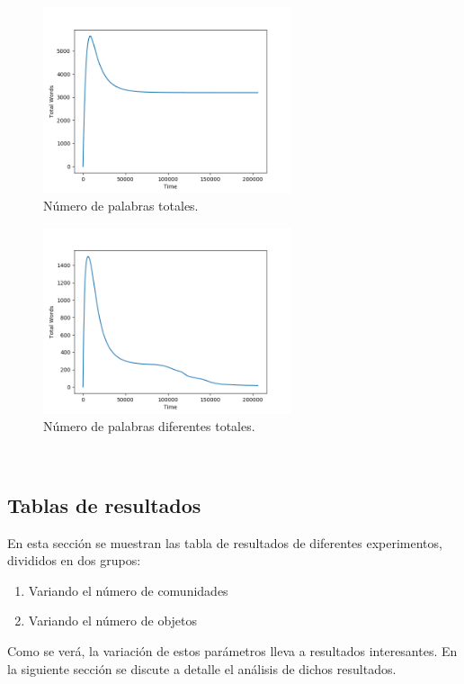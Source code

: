 \documentclass[runningheads]{llncs}
\begin{document}
\begin{figure}[H]
	\centering
	\includegraphics[width=0.65\textwidth]{Figure_333_TotalWords.png}
	\caption{Número de palabras totales.}
	\label{fig_006}
\end{figure}
\begin{figure}[H]
	\centering
	\includegraphics[width=0.65\textwidth]{Figure_333_TotalDifferentWords.png}
	\caption{Número de palabras diferentes totales.}
	\label{fig_007}
\end{figure}
\\
\subsection{Tablas de resultados}

En esta sección se muestran las tabla de resultados de diferentes experimentos, divididos en dos grupos:

\begin{enumerate}
	\item Variando el número de comunidades
	\item Variando el número de objetos
\end{enumerate}

Como se verá, la variación de estos parámetros lleva a resultados interesantes. En la siguiente sección se discute a detalle el análisis de dichos resultados.
\end{document}
